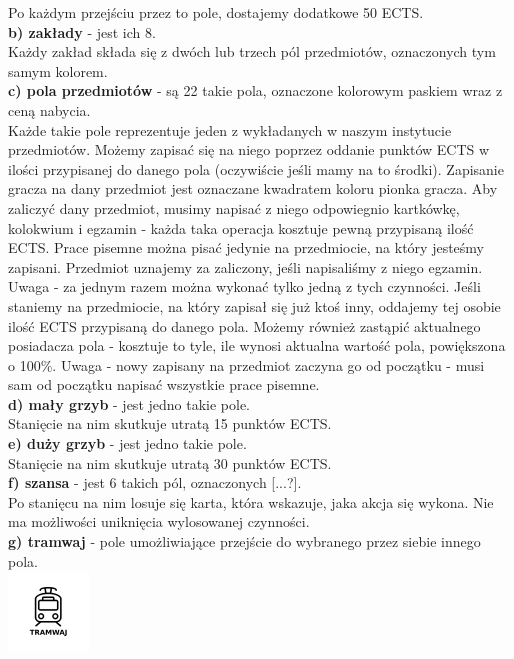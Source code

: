 \documentclass[a4paper]{article}
\begin{document}
\indent Po każdym przejściu przez to pole, dostajemy dodatkowe 50 ECTS.\\
\noindent \textbf{b) zakłady} - jest ich 8.\\
\indent Każdy zakład składa się z dwóch lub trzech pól przedmiotów, oznaczonych tym samym kolorem.\\
\noindent \textbf{c) pola przedmiotów} - są 22 takie pola, oznaczone kolorowym paskiem wraz z ceną nabycia.\\ \indent Każde takie pole reprezentuje jeden z wykładanych w naszym instytucie przedmiotów. Możemy zapisać się na niego poprzez oddanie punktów ECTS w ilości przypisanej do danego pola (oczywiście jeśli mamy na to środki). Zapisanie gracza na dany przedmiot jest oznaczane kwadratem koloru pionka gracza. Aby zaliczyć dany przedmiot, musimy napisać z niego odpowiegnio kartkówkę, kolokwium i egzamin - każda taka operacja kosztuje pewną przypisaną ilość ECTS. Prace pisemne można pisać jedynie na przedmiocie, na który jesteśmy zapisani. Przedmiot uznajemy za zaliczony, jeśli napisaliśmy z niego egzamin. Uwaga - za jednym razem można wykonać tylko jedną z tych czynności. Jeśli staniemy na przedmiocie, na który zapisał się już ktoś inny, oddajemy tej osobie ilość ECTS przypisaną do danego pola. Możemy również zastąpić aktualnego posiadacza pola - kosztuje to tyle, ile wynosi aktualna wartość pola, powiększona o 100\%. Uwaga - nowy zapisany na przedmiot zaczyna go od początku - musi sam od początku napisać wszystkie prace pisemne.\\ 
\noindent \textbf{d) mały grzyb} - jest jedno takie pole.\\
\indent Stanięcie na nim skutkuje utratą 15 punktów ECTS.\\
\noindent \textbf{e) duży grzyb} - jest jedno takie pole.\\
\indent Stanięcie na nim skutkuje utratą 30 punktów ECTS.\\
\noindent \textbf{f) szansa} - jest 6 takich pól, oznaczonych [...?]. \\
\indent Po stanięcu na nim losuje się karta, która wskazuje, jaka akcja się wykona. Nie ma możliwości uniknięcia wylosowanej czynności.\\
\noindent \textbf{g) tramwaj} - pole umożliwiające przejście do wybranego przez siebie innego pola.\\
\indent\includegraphics[scale=0.8]{tram.png}\\
\end{document}
